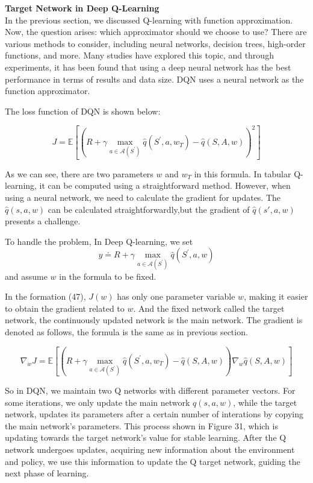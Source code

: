 \documentclass{article}
\begin{document}
\noindent
\textbf{Target Network in Deep Q-Learning}\\
\noindent
In the previous section, we discussed Q-learning with function approximation. Now, the question arises: which approximator should we choose to use? There are various methods to consider, including neural networks, decision trees, high-order functions, and more. Many studies have explored this topic, and through experiments, it has been found that using a deep neural network has the best performance in terms of results and data size. DQN uses a neural network as the function approximator.

The loss function of DQN is shown below:

\begin{equation}
J=\mathbb{E}\left[\left(R+\gamma \max _{a \in \mathcal{A}\left(S^{\prime}\right)} \hat{q}\left(S^{\prime}, a, w_T\right)-\hat{q}(S, A, w)\right)^2\right]
\end{equation}

As we can see, there are two parameters $w$ and $w_{T}$ in this formula. In tabular Q-learning, it can be computed using a straightforward method. However, when using a neural network, we need to calculate the gradient for updates. The $\hat{q}(s,a,w)$ can be calculated straightforwardly,but the gradient of $\hat{q}(s',a,w)$ presents a challenge.

To handle the problem, In Deep Q-learning, we set
\begin{equation}
y \doteq R+\gamma \max _{a \in \mathcal{A}\left(S^{\prime}\right)} \hat{q}\left(S^{\prime}, a, w\right)
\end{equation}
and assume $w$ in the formula to be fixed.

In the formation (47), $J(w)$ has only one parameter variable $w$, making it easier to obtain the gradient related to $w$. And the fixed network called the target network, the continuously updated network is the main network. The gradient is denoted as follows, the formula is the same as in previous section.


\begin{equation}
\nabla_w J=\mathbb{E}\left[\left(R+\gamma \max _{a \in \mathcal{A}\left(S^{\prime}\right)} \hat{q}\left(S^{\prime}, a, w_T\right)-\hat{q}(S, A, w)\right) \nabla_w \hat{q}(S, A, w)\right]
\end{equation}

So in DQN, we maintain two Q networks with different parameter vectors. For some iterations, we only update the main network $q(s,a,w)$, while the target network, updates its parameters after a certain number of interations by copying the main network's parameters. This process shown in Figure 31, which is updating towards the target network's value for stable learning. After the Q network undergoes updates, acquiring new information about the environment and policy, we use this information to update the Q target network, guiding the next phase of learning.
\end{document}
